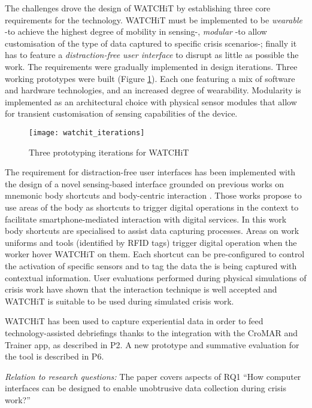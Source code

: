 The challenges drove the design of WATCHiT by establishing three core requirements for the technology. WATCHiT must be implemented to be \emph{wearable} -to achieve the highest degree of mobility in sensing-, \emph{modular} -to allow customisation of the type of data captured to specific crisis scenarios-; finally it has to feature a \emph{distraction-free user interface} to disrupt as little as possible the work. The requirements were gradually implemented in design iterations. Three working prototypes were built (Figure \ref{fig:watchit-prototypes}). Each one featuring a mix of software and hardware technologies, and an increased degree of wearability. Modularity is implemented as an architectural choice with physical sensor modules that allow for transient customisation of sensing capabilities of the device.

\begin{figure}
	[tbh] \centering 
	\texttt{[image: watchit\_iterations]} \caption{Three prototyping iterations for WATCHiT} \label{fig:watchit-prototypes} 
\end{figure}

The requirement for distraction-free user interfaces has been implemented with the design of a novel sensing-based interface grounded on previous works on mnemonic body shortcuts and body-centric interaction \autocites{Guerreiro:2008wt}{Chen:2012wk}. Those works propose to use areas of the body as shortcuts to trigger digital operations in the context to facilitate smartphone-mediated interaction with digital services. In this work body shortcuts are specialised to assist data capturing processes. Areas on work uniforms and tools (identified by RFID tags) trigger digital operation when the worker hover WATCHiT on them. Each shortcut can be pre-configured to control the activation of specific sensors and to tag the data the is being captured with contextual information. User evaluations performed during physical simulations of crisis work have shown that the interaction technique is well accepted and WATCHiT is suitable to be used during simulated crisis work.

WATCHiT has been used to capture experiential data in order to feed technology-assisted debriefings thanks to the integration with the CroMAR and Trainer app, as described in P2. A new prototype and summative evaluation for the tool is described in P6.

\emph{Relation to research questions:} The paper covers aspects of RQ1 ``How computer interfaces can be designed to enable unobtrusive data collection during crisis work?''

